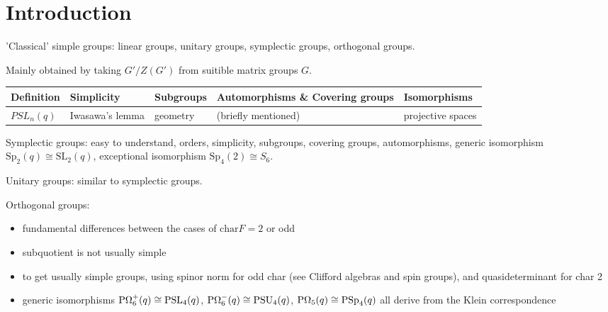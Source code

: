 \documentclass[a4paper & 11pt]{article}
\def\maintitle#1{\section*{#1}}
\def\subtitle#1{\section{#1}}
\begin{document}
\else %
    \ifx\chaptitle\undefined %
        \def\maintitle#1{\subsection{#1}}
        \def\subtitle#1{\subsubsection{#1}}
    \else %
        \def\maintitle#1{\section{#1}}
        \def\subtitle#1{\subsection{#1}}
    \fi
\fi

\maintitle{Introduction}

'Classical' simple groups: linear groups, unitary groups,  symplectic groups, orthogonal groups.

Mainly obtained by taking $G'/Z(G')$ from suitible matrix groups $G$.


\begin{table}[htbp]
    \centering
    \begin{tabular}{lllll}
        Definition &
        Simplicity & 
        Subgroups & 
        Automorphisms \& Covering groups & 
        Isomorphisms \\
        \hline
        $PSL_n(q)$ &
        Iwasawa's lemma &
        geometry &
        (briefly mentioned) &
        projective spaces \\
    \end{tabular}
\end{table}

Symplectic groups: easy to understand, orders, simplicity, subgroups, covering groups, automorphisms, generic isomorphism $\mathrm{Sp}_2(q)\cong\mathrm{SL}_2(q)$, exceptional isomorphism $\mathrm{Sp}_4(2)\cong S_6$.

Unitary groups: similar to symplectic groups.

Orthogonal groups:\vspace{-3mm}
\begin{itemize}[itemsep=0pt]
    \item fundamental differences between the cases of $\mathrm{char}{F}=2$ or odd
    \item subquotient is not usually simple
    \item to get usually simple groups, using spinor norm for odd char (see Clifford algebras and spin groups), and quasideterminant for char 2
    \item generic isomorphisms $\mathrm{P\Omega}_6^+(q)\cong \mathrm{PSL}_4(q)$, $\mathrm{P\Omega}_6^-(q)\cong\mathrm{PSU}_4(q)$, $\mathrm{P\Omega}_5(q)\cong\mathrm{PSp}_4(q)$ all derive from the Klein correspondence
\end{itemize}
\end{document}
